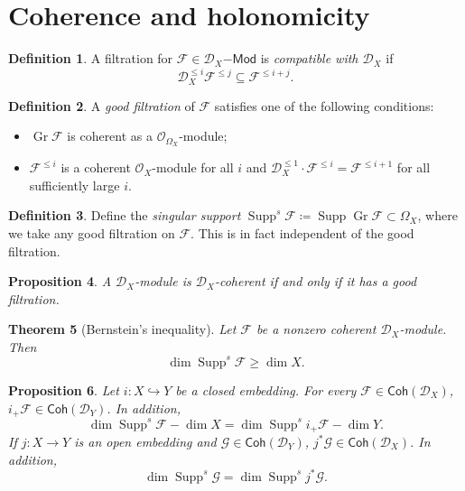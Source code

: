 \documentclass[leqno, openany]{memoir}
\newtheorem{thm}{Theorem}[section]
\newtheorem{prop}[thm]{Proposition}
\theoremstyle{definition}
\newtheorem{defn}[thm]{Definition}
\theoremstyle{remark}
\theoremstyle{plain}
\theoremstyle{definition}
\theoremstyle{remark}
\newcommand{\mc}[1]{\mathcal{#1}}
\newcommand{\on}[1]{\operatorname{#1}}
\newcommand{\ms}[1]{\mathsf{#1}}
\DeclareMathOperator{\Supp}{Supp}
\begin{document}
\section{Coherence and holonomicity}

\begin{defn}
    A filtration for $\mc{F} \in \mc{D}_X\ms{-Mod}$ is \textit{compatible with $\mc{D}_X$} if 
    \[ \mc{D}_X^{\leq i} \mc{F}^{\leq j} \subseteq \mc{F}^{\leq i+j}. \]
\end{defn}

\begin{defn}
    A \textit{good filtration} of $\mc{F}$ satisfies one of the following conditions:
    \begin{itemize}
        \item $\on{Gr} \mc{F}$ is coherent as a $\mc{O}_{\Omega_X}$-module;
        \item $\mc{F}^{\leq i}$ is a coherent $\mc{O}_X$-module for all $i$ and $\mc{D}_X^{\leq 1} \cdot \mc{F}^{\leq i} = \mc{F}^{\leq i+1}$ for all sufficiently large $i$.
    \end{itemize}
\end{defn}

\begin{defn}
    Define the \textit{singular support} $\Supp^s \mc{F} \coloneqq \Supp \on{Gr} \mc{F} \subset \Omega_X$, where we take any good filtration on $\mc{F}$. This is in fact independent of the good filtration.
\end{defn}

\begin{prop}
    A $\mc{D}_X$-module is $\mc{D}_X$-coherent if and only if it has a good filtration.
\end{prop}

\begin{thm}[Bernstein's inequality]
    Let $\mc{F}$ be a nonzero coherent $\mc{D}_X$-module. Then 
    \[ \dim \Supp^s \mc{F} \geq \dim X. \]
\end{thm}

\begin{prop}
    Let $i \colon X \hookrightarrow Y$ be a closed embedding. For every $\mc{F} \in \ms{Coh}(\mc{D}_X)$, $i_+ \mc{F} \in \ms{Coh}(\mc{D}_Y)$. In addition, 
    \[ \dim \Supp^s \mc{F} - \dim X = \dim \Supp^s i_+ \mc{F} - \dim Y. \] 
    If $j \colon X \to Y$ is an open embedding and $\mc{G} \in \ms{Coh}(\mc{D}_Y)$, $j^* \mc{G} \in \ms{Coh}(\mc{D}_X)$. In addition, 
    \[ \dim \Supp^s \mc{G} = \dim \Supp^s j^* \mc{G}. \]
\end{prop}
\end{document}
